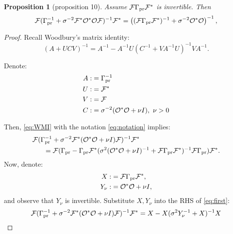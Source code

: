 \documentclass{article}
\newtheorem{proposition}{Proposition}
\begin{document}
\begin{proposition}[proposition 10]%
  Assume $\mathcal{F} \Gamma_{\textup{pr}} \mathcal{F}^*$ is invertible. Then
  \begin{align*}
    \begin{split}
      \mathcal{F}( \Gamma_{\textup{pr}}^{-1} + \sigma^{-2}  \mathcal{F}^* \mathcal{O}^* \mathcal{O} \mathcal{F} )^{-1} \mathcal{F}^* 
      = \left ( (\mathcal{F}\Gamma_{\textup{pr}}\mathcal{F}^*)^{-1} + \sigma^{-2}  \mathcal{O}^* \mathcal{O} \right )^{-1},
    \end{split}
  \end{align*}  
\end{proposition}


\begin{proof}
  Recall Woodbury's matrix identity:
  \begin{equation}\label{eq:WMI}
    (A + UCV)^{-1} = A^{-1} - A^{-1}U(C^{-1} + VA^{-1}U)^{-1}VA^{-1}. 
  \end{equation}

  Denote:
  \begin{align}\label{eq:notation}
    \begin{split}
      A :&= \Gamma_{\textup{pr}}^{-1} \\
      U :&= \mathcal{F}^* \\
      V :&= \mathcal{F} \\
      C :&= \sigma^{-2} (\mathcal{O}^*\mathcal{O}+\nu I),\ \nu > 0
    \end{split}
  \end{align}

  Then, \eqref{eq:WMI} with the notation \eqref{eq:notation} implies:
  \begin{align}\label{eq:first}
    \begin{split}
    &\mathcal{F}( \Gamma_{\textup{pr}}^{-1} + \sigma^{-2}  \mathcal{F}^* (\mathcal{O}^* \mathcal{O} +\nu I) \mathcal{F} )^{-1}\mathcal{F}^* \\
    &\ \ \ \ \ = \mathcal{F} ( \Gamma_{\textup{pr}} - \Gamma_{\textup{pr}} \mathcal{F}^* ( \sigma^2(\mathcal{O}^*\mathcal{O} + \nu I)^{-1} + \mathcal{F} \Gamma_{\textup{pr}} \mathcal{F}^* )^{-1} \mathcal{F} \Gamma_{\textup{pr}} ) \mathcal{F}^*. \\
    \end{split}
  \end{align}
  Now, denote:
  \begin{align*}
    X :&= \mathcal{F}\Gamma_{\textup{pr}} \mathcal{F}^*, \\
    Y_{\nu} :&= \mathcal{O}^*\mathcal{O} + \nu I,
  \end{align*}
  and observe that $Y_{\nu}$ is invertible. Substitute $X, Y_{\nu}$
  into the RHS of \eqref{eq:first}:
   \begin{equation}\label{eq:second}
     \mathcal{F}( \Gamma_{\textup{pr}}^{-1} + \sigma^{-2}  \mathcal{F}^* (\mathcal{O}^* \mathcal{O} +\nu I) \mathcal{F} )^{-1}\mathcal{F}^* = X - X(\sigma^2Y_{\nu}^{-1} + X)^{-1}X
   \end{equation}


\end{proof}
\end{document}
